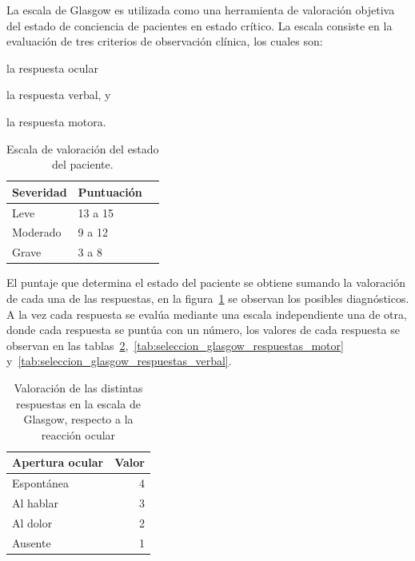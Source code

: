 La escala de Glasgow es utilizada como una herramienta de valoración objetiva
del estado de conciencia de pacientes en estado crítico\cite{protocolo}. La
escala consiste en la evaluación de tres criterios de observación clínica,
los cuales son: 
\begin{enumerate*}[label=\itshape\alph*\upshape.]
\item la respuesta ocular
\item la respuesta verbal, y
\item la respuesta motora.
\end{enumerate*}

\begin{table}[!hbt]
\centering
\begin{tabular}{llr}
\toprule
\textbf{Severidad} & 
\textbf{Puntuación} \\ 
\midrule
 Leve & 13 a 15 \\
 Moderado & 9 a 12 \\
 Grave & 3 a 8 \\
\bottomrule
\end{tabular}
\caption{Escala de valoración del estado del paciente\cite{helmick2007mild}.}
\label{tab:seleccion_glasgow_estado}
\end{table}

El puntaje que determina el estado del paciente se obtiene sumando la valoración
de cada una de las respuestas, en la figura~\ref{tab:seleccion_glasgow_estado}
se observan los posibles diagnósticos. A la vez cada respuesta se evalúa
mediante una escala independiente una de otra, donde cada respuesta se puntúa
con un número\cite{glasgow:doc}, los valores de cada respuesta se observan en las
tablas~\ref{tab:seleccion_glasgow_respuestas_ocular},~\ref{tab:seleccion_glasgow_respuestas_motor}
y~\ref{tab:seleccion_glasgow_respuestas_verbal}.

\begin{table}[!hbt]
\centering
\begin{tabular}{lr}
\toprule
\textbf{Apertura ocular} & \textbf{Valor} \\
\midrule
Espontánea & 4 \\
Al hablar & 3 \\
Al dolor & 2 \\
Ausente & 1 \\
\bottomrule
\end{tabular}
\caption{Valoración de las distintas respuestas en la escala de Glasgow,
    respecto a la reacción ocular}
\label{tab:seleccion_glasgow_respuestas_ocular}
\end{table}

